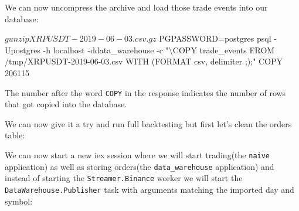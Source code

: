 \documentclass[
  oneside]{book}
\newenvironment{Shaded}{\begin{snugshade}}{\end{snugshade}}
\newcommand{\AttributeTok}[1]{\textcolor[rgb]{0.77,0.63,0.00}{#1}}
\newcommand{\ExtensionTok}[1]{#1}
\newcommand{\KeywordTok}[1]{\textcolor[rgb]{0.13,0.29,0.53}{\textbf{#1}}}
\newcommand{\NormalTok}[1]{#1}
\newcommand{\StringTok}[1]{\textcolor[rgb]{0.31,0.60,0.02}{#1}}
\newcommand{\VariableTok}[1]{\textcolor[rgb]{0.00,0.00,0.00}{#1}}
\begin{document}
We can now uncompress the archive and load those trade events into our database:

\begin{Shaded}
\begin{Highlighting}[]
\ExtensionTok{$}\NormalTok{ gunzip XRPUSDT{-}2019{-}06{-}03.csv.gz}
\ExtensionTok{$}\NormalTok{ PGPASSWORD=postgres psql }\AttributeTok{{-}Upostgres} \AttributeTok{{-}h}\NormalTok{ localhost }\AttributeTok{{-}ddata\_warehouse}  \AttributeTok{{-}c} \StringTok{"\textbackslash{}COPY trade\_events FROM \textquotesingle{}/tmp/XRPUSDT{-}2019{-}06{-}03.csv\textquotesingle{} WITH (FORMAT csv, delimiter \textquotesingle{};\textquotesingle{});"}
\ExtensionTok{COPY}\NormalTok{ 206115}
\end{Highlighting}
\end{Shaded}

The number after the word \texttt{COPY} in the response indicates the number of rows that got copied into the database.

We can now give it a try and run full backtesting but first let's clean the orders table:

\begin{Shaded}
\end{Shaded}

We can now start a new iex session where we will start trading(the \texttt{naive} application) as well as storing orders(the \texttt{data\_warehouse} application) and instead of starting the \texttt{Streamer.Binance} worker we will start the \texttt{DataWarehouse.Publisher} task with arguments matching the imported day and symbol:
\end{document}
